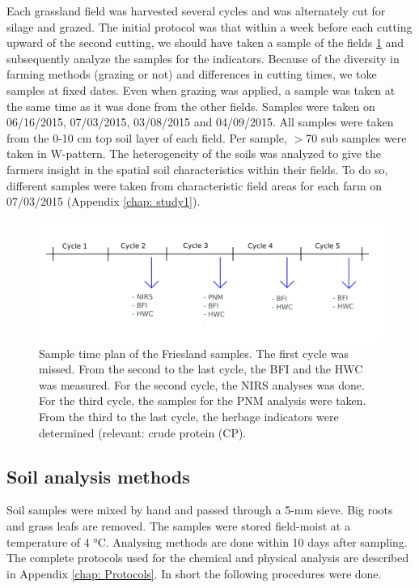 \documentclass[10pt,twoside,dutch,english]{report}
\begin{document}
Each grassland field was harvested several cycles and was alternately cut for silage and grazed. The initial protocol was that within a week before each cutting upward of the second cutting, we should have taken a sample of the fields \ref{fig:mm_samples} and subsequently analyze the samples for the indicators. Because of the diversity in farming methods (grazing or not) and differences in cutting times, we toke samples at fixed dates.  Even when grazing was applied, a sample was taken at the same time as it was done from the other fields. Samples were taken on 06/16/2015, 07/03/2015, 03/08/2015 and 04/09/2015. All samples were taken from the 0-10 cm top soil layer of each field. Per sample, $>$70 sub samples were taken in W-pattern. The heterogeneity of the soils was analyzed to give the farmers insight in the spatial soil characteristics within their fields. To do so, different samples were taken from characteristic field areas for each farm on 07/03/2015 (Appendix \ref{chap: study1}).

\begin{figure}[h] %
	\includegraphics[width=1\linewidth]{mm_samples}
	\caption{Sample time plan of the Friesland samples. The first cycle was missed. From the second to the last cycle, the BFI and the HWC was measured. For the second cycle, the NIRS analyses was done. For the third cycle, the samples for the PNM analysis were taken. From the third to the last cycle, the herbage indicators were determined (relevant: crude protein (CP). }
	\label{fig:mm_samples}
\end{figure}

\subsection{Soil analysis methods}
Soil samples were mixed by hand and passed through a 5-mm sieve. Big roots and grass leafs are removed. The samples were stored field-moist at a temperature of 4 °C. Analysing methods are done within 10 days after sampling. 
The complete protocols used for the chemical and physical analysis are described in Appendix \ref{chap: Protocols}. In short the following procedures were done. 
\end{document}
